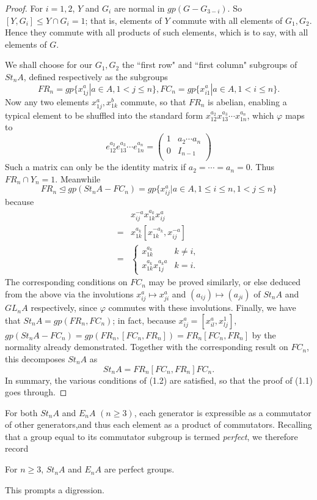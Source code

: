 \begin{proof}
For $i=1,2$, $Y$ and $G_i$ are normal in $gp(G-G_{3-i})$. So $[Y,G_i]\leqslant Y\cap G_i=1$; that is, elements of $Y$ commute with all elements of $G_1,G_2$. Hence they commute with all products of such elements, which is to say, with all elements of $G$.

We shall choose for our $G_1,G_2$ the ``first row" and ``first column" subgroups of $St_nA$, defined respectively as the subgroups
\[FR_n=gp\{x^a_{1j}|a\in A, 1<j\leqslant n\},FC_n=gp\{x_{i1}^a|a\in A,1<i\leqslant n\}.\]
Now any two elements $x_{1j}^a,x_{1k}^b$ commute, so that $FR_n$ is abelian, enabling a typical element to be shuffled into the standard form $x_{12}^{a_2}x_{13}^{a_3}\cdots x_{1n}^{a_n}$, which $\varphi$ maps to
\[e_{12}^{a_2}e_{13}^{a_3}\cdots e_{1n}^{a_n}=\left(\begin{array}{c|c}
1& a_2\cdots a_n \\
\hline
0&I_{n-1}\\
\end{array}\right) \]
Such a matrix can only be the identity matrix if $a_2=\cdots=a_n=0$. Thus $FR_n\cap Y_n=1$. 
Meanwhile
\[FR_n\trianglelefteq gp(St_nA-FC_n)=gp\{x_{ij}^a|a\in A,1\leqslant i\leqslant n,1<j\leqslant n\}\]
because
\begin{equation*}
\begin{array}{rl}
&x_{ij}^{-a}x_{1k}^{a_k}x_{ij}^a\\
=& x_{1k}^{a_k}[x_{1k}^{-a_k},x_{ij}^{-a}]\\
=&\begin{cases}
x_{1k}^{a_k} &k\neq i,\\
x_{1k}^{a_k}x_{1j}^{a_ka} &k=i.
\end{cases}
\end{array}
\end{equation*}
The corresponding conditions on $FC_n$ may be proved similarly, or else deduced from the above via the involutions $x_{ij}^a\mapsto x_{ji}^a$ and $(a_{ij})\mapsto (a_{ji})$ of $St_nA$ and $GL_nA$ respectively, since $\varphi$ commutes with these involutions. Finally, we have that $St_nA=gp(FR_n,FC_n)$; in fact, because $x_{ij}^a=[x_{il}^a,x_{lj}^1]$, 
$gp(St_nA-FC_n)=gp(FR_n,[FC_n,FR_n])=FR_n[FC_n,FR_n]$ by the normality already demonstrated. Together with the corresponding result on $FC_n$, this decomposes $St_nA$ as
\[St_nA=FR_n[FC_n,FR_n]FC_n.\]
In summary, the various conditions of (1.2) are satisfied, so that the proof of (1.1) goes through.
\end{proof}
For both $St_nA$ and $E_nA$ $(n\geqslant 3)$, each generator is expressible as a commutator of other generators,and thus each element as a product of commutators. Recalling that a group equal to its commutator subgroup is termed {\em perfect}, we therefore record
\begin{prop}
For $n \geqslant 3$, $St_n A$ and $E_n A$ are perfect groups.
\end{prop}
This prompts a digression.
